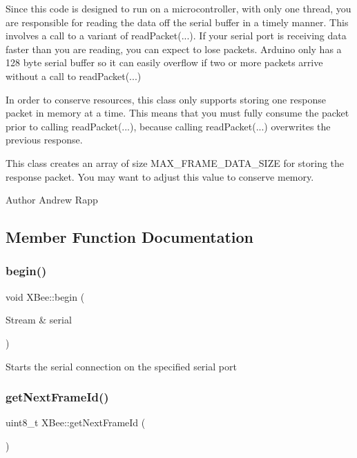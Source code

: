 Since this code is designed to run on a microcontroller, with only one thread, you are responsible for reading the data off the serial buffer in a timely manner. This involves a call to a variant of read\+Packet(...). If your serial port is receiving data faster than you are reading, you can expect to lose packets. Arduino only has a 128 byte serial buffer so it can easily overflow if two or more packets arrive without a call to read\+Packet(...) 

In order to conserve resources, this class only supports storing one response packet in memory at a time. This means that you must fully consume the packet prior to calling read\+Packet(...), because calling read\+Packet(...) overwrites the previous response. 

This class creates an array of size M\+A\+X\+\_\+\+F\+R\+A\+M\+E\+\_\+\+D\+A\+T\+A\+\_\+\+S\+I\+ZE for storing the response packet. You may want to adjust this value to conserve memory.

\begin{DoxyAuthor}{Author}
Andrew Rapp 
\end{DoxyAuthor}


\subsection{Member Function Documentation}
\hypertarget{class_x_bee_a2d170fc3f2412712adee0af794dc6263}{}\label{class_x_bee_a2d170fc3f2412712adee0af794dc6263} 
\subsubsection{\texorpdfstring{begin()}{begin()}}
{\footnotesize\ttfamily void X\+Bee\+::begin (\begin{DoxyParamCaption}\item[{Stream \&}]{serial }\end{DoxyParamCaption})}

Starts the serial connection on the specified serial port \hypertarget{class_x_bee_a25bd226e41517e8a66a13e531d31438d}{}\label{class_x_bee_a25bd226e41517e8a66a13e531d31438d} 
\subsubsection{\texorpdfstring{get\+Next\+Frame\+Id()}{getNextFrameId()}}
{\footnotesize\ttfamily uint8\+\_\+t X\+Bee\+::get\+Next\+Frame\+Id (\begin{DoxyParamCaption}{ }\end{DoxyParamCaption})}

